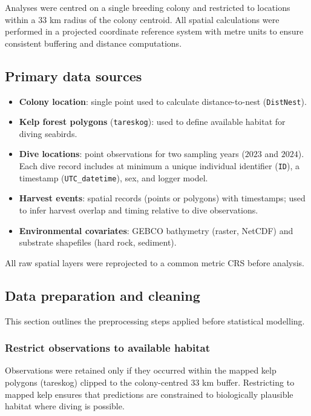 \documentclass[
  letterpaper,
  DIV=11,
  numbers=noendperiod]{scrartcl}
\begin{document}
Analyses were centred on a single breeding colony and restricted to
locations within a \(33\) km radius of the colony centroid. All spatial
calculations were performed in a projected coordinate reference system
with metre units to ensure consistent buffering and distance
computations.

\subsection{Primary data sources}\label{primary-data-sources}

\begin{itemize}
\item
  \textbf{Colony location}: single point used to calculate
  distance-to-nest (\texttt{DistNest}).
\item
  \textbf{Kelp forest polygons} (\texttt{tareskog}): used to define
  available habitat for diving seabirds.
\item
  \textbf{Dive locations}: point observations for two sampling years
  (\(2023\) and \(2024\)). Each dive record includes at minimum a unique
  individual identifier (\texttt{ID}), a timestamp
  (\texttt{UTC\_datetime}), sex, and logger model.
\item
  \textbf{Harvest events}: spatial records (points or polygons) with
  timestamps; used to infer harvest overlap and timing relative to dive
  observations.
\item
  \textbf{Environmental covariates}: GEBCO bathymetry (raster, NetCDF)
  and substrate shapefiles (hard rock, sediment).
\end{itemize}

All raw spatial layers were reprojected to a common metric CRS before
analysis.

\subsection{Data preparation and
cleaning}\label{data-preparation-and-cleaning}

This section outlines the preprocessing steps applied before statistical
modelling.

\subsubsection{Restrict observations to available
habitat}\label{restrict-observations-to-available-habitat}

Observations were retained only if they occurred within the mapped kelp
polygons (tareskog) clipped to the colony-centred 33 km buffer.
Restricting to mapped kelp ensures that predictions are constrained to
biologically plausible habitat where diving is possible.
\end{document}
